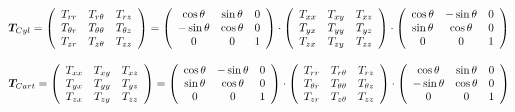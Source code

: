 \[
{\bm T}_{\tiny Cyl}=
\left(
\begin{array}{ccc}
T_{rr}       & T_{r\theta}      & T_{rz} \\
T_{\theta r} & T_{\theta\theta} & T_{\theta z} \\
T_{z r}      & T_{z \theta}     & T_{zz}
\end{array}
\right)
=
\left(
\begin{array}{ccc}
 \cos \theta&\sin \theta&0 \\
-\sin \theta&\cos \theta&0 \\
0 & 0 & 1 
\end{array}
\right)
\cdot
\left(
\begin{array}{ccc}
T_{xx} & T_{xy} & T_{xz} \\
T_{yx} & T_{yy} & T_{yz} \\
T_{zx} & T_{zy} & T_{zz} 
\end{array}
\right)
\cdot
\left(
\begin{array}{ccc}
\cos \theta & -\sin \theta&0 \\
\sin \theta &  \cos \theta&0 \\
0 & 0 & 1 
\end{array}
\right)
\]

\[
{\bm T}_{\tiny Cart}=
\left(
\begin{array}{ccc}
T_{xx} & T_{xy} & T_{xz} \\
T_{yx} & T_{yy} & T_{yz} \\
T_{zx} & T_{zy} & T_{zz} 
\end{array}
\right)
=
\left(
\begin{array}{ccc}
 \cos \theta&-\sin \theta&0 \\
\sin \theta&\cos \theta&0 \\
0 & 0 & 1 
\end{array}
\right)
\cdot
\left(
\begin{array}{ccc}
T_{rr}       & T_{r\theta}      & T_{rz} \\
T_{\theta r} & T_{\theta\theta} & T_{\theta z} \\
T_{z r}      & T_{z \theta}     & T_{zz}
\end{array}
\right)
\cdot
\left(
\begin{array}{ccc}
\cos \theta & \sin \theta&0 \\
-\sin \theta &  \cos \theta&0 \\
0 & 0 & 1 
\end{array}
\right)
\]



